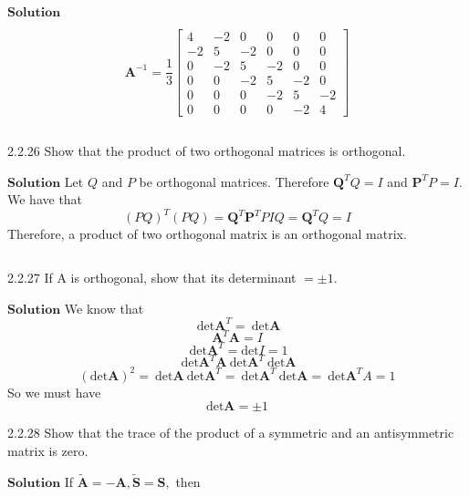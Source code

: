 $\boxed{\textbf{Solution}}$

$$\mathbf{A}^{-1}=\frac{1}{3}\begin{bmatrix}{4} & {-2} & {0} & {0} & {0} & {0} \\ {-2} & {5} & {-2} & {0} & {0} & {0} \\ {0} & {-2} & {5} & {-2} & {0} & {0} \\ {0} & {0} & {-2} & {5} & {-2} & {0} \\ {0} & {0} & {0} & {-2} & {5} & {-2} \\ {0} & {0} & {0} & {0} & {-2} & {4}\end{bmatrix}$$


$$$$

\begin{mybox}{2.2.26}
Show that the product of two orthogonal matrices is orthogonal.
\end{mybox}



$\boxed{\textbf{Solution}}$ Let $Q$ and $P$ be orthogonal matrices. Therefore $\mathbf{Q}^{T} Q=I$ and $\mathbf{P}^{T} P=I .$
We have that
$$
(P Q)^{T}(P Q)=\mathbf{Q}^{T} \mathbf{P}^{T} P I Q=\mathbf{Q}^{T} Q=I
$$
Therefore, a product of two orthogonal matrix is an orthogonal matrix.

$$$$




\begin{mybox}{2.2.27}
If A is orthogonal, show that its determinant $=\pm 1 .$
\end{mybox}



$\boxed{\textbf{Solution}}$ We know that
$$\ \text{det} \mathbf{A}^T = \ \text{det} \mathbf{A}$$
$$\mathbf{A}^T\mathbf{A}=I$$
$$\ \text{det} \mathbf{A}^T = \text{det}I = 1$$
$$\ \text{det} \mathbf{A}^T\mathbf{A} \ \text{det} \mathbf{A}^T \ \text{det} \mathbf{A}$$
$$(\text{det} \mathbf{A})^2 = \ \text{det} \mathbf{A} \ \text{det} \mathbf{A}^T = \ \text{det} \mathbf{A}^T \ \text{det} \mathbf{A} = \ \text{det} \mathbf{A}^TA = 1$$
So we must have
$$\text{det}\mathbf{A} = \pm 1$$





\begin{mybox}{2.2.28}
Show that the trace of the product of a symmetric and an antisymmetric matrix is zero.
\end{mybox}


$\boxed{\textbf{Solution}}$  
If $\tilde{\mathbf{A}}=-\mathbf{A}, \tilde{\mathbf{S}}=\mathbf{S},$ then

